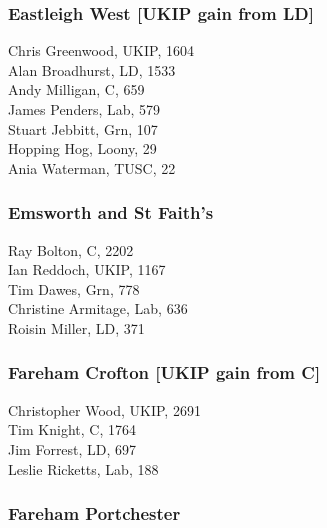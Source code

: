 \documentclass[a4paper,openany,10pt]{book}
\begin{document}
\subsubsection*{Eastleigh West \hspace*{\fill}\nolinebreak[1]%
\enspace\hspace*{\fill}
[UKIP gain from LD]}



Chris Greenwood, UKIP, 1604\\
Alan Broadhurst, LD, 1533\\
Andy Milligan, C, 659\\
James Penders, Lab, 579\\
Stuart Jebbitt, Grn, 107\\
Hopping Hog, Loony, 29\\
Ania Waterman, TUSC, 22\\


\subsubsection*{Emsworth and St Faith's}



Ray Bolton, C, 2202\\
Ian Reddoch, UKIP, 1167\\
Tim Dawes, Grn, 778\\
Christine Armitage, Lab, 636\\
Roisin Miller, LD, 371\\


\subsubsection*{Fareham Crofton \hspace*{\fill}\nolinebreak[1]%
\enspace\hspace*{\fill}
[UKIP gain from C]}



Christopher Wood, UKIP, 2691\\
Tim Knight, C, 1764\\
Jim Forrest, LD, 697\\
Leslie Ricketts, Lab, 188\\


\subsubsection*{Fareham Portchester}
\end{document}
